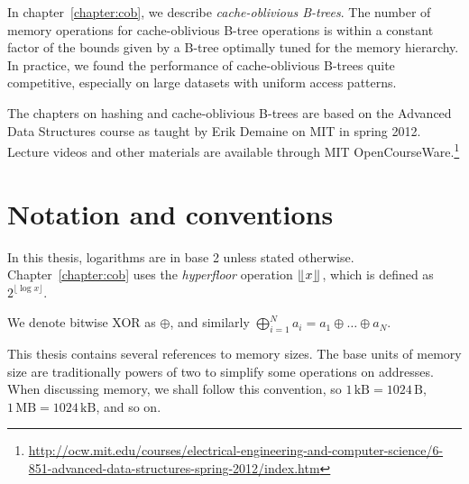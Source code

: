 In chapter~\ref{chapter:cob}, we describe \emph{cache-oblivious B-trees}.
The number of memory operations for cache-oblivious B-tree operations
is within a constant factor of the bounds given by a B-tree optimally tuned
for the memory hierarchy. In practice, we found the performance of
cache-oblivious B-trees quite competitive, especially on large datasets
with uniform access patterns.

The chapters on hashing and cache-oblivious B-trees are based on the Advanced
Data Structures course as taught by Erik Demaine on MIT in spring 2012.
Lecture videos and other materials are available through MIT OpenCourseWare.\footnote{%
\url{http://ocw.mit.edu/courses/electrical-engineering-and-computer-science/6-851-advanced-data-structures-spring-2012/index.htm}}

\section*{Notation and conventions}
In this thesis, logarithms are in base 2 unless stated otherwise.
Chapter~\ref{chapter:cob} uses the \emph{hyperfloor} operation
$\lfloor \kern -0.22em \lfloor x\rfloor \kern -0.22em \rfloor$, which is defined as $2^{\lfloor\log x\rfloor}$.

We denote bitwise XOR as $\oplus$, and similarly $\bigoplus_{i=1}^N
a_i=a_1\oplus\ldots\oplus a_N$.

This thesis contains several references to memory sizes. The base units of
memory size are traditionally powers of two to simplify some operations on
addresses.
When discussing memory, we shall follow this convention, so
$1\,\mathrm{kB}=1024\,\mathrm{B}$, $1\,\mathrm{MB}=1024\,\mathrm{kB}$,
and so on.
